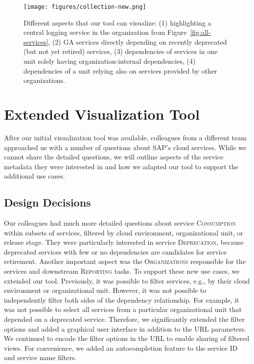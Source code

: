 \documentclass[conference]{IEEEtran}
\begin{document}
\begin{figure}
    \centering
    \texttt{[image: figures/collection-new.png]}
    \caption{Different aspects that our tool can visualize: (1) highlighting a central logging service in the organization from Figure~\ref{fig:all-services}, (2) GA services directly depending on recently deprecated (but not yet retired) services, (3) dependencies of services in one unit solely having organization-internal dependencies, (4) dependencies of a unit relying also on services provided by other organizations.}
    \label{fig:collection}
\end{figure}


\section{Extended Visualization Tool}
\label{sec:visualization-extended}

After our initial visualization tool was available, colleagues from a different team approached us with a number of questions about SAP's cloud services.
While we cannot share the detailed questions, we will outline aspects of the service metadata they were interested in and how we adapted our tool to support the additional use cases.

\subsection{Design Decisions}

Our colleagues had much more detailed questions about service \textsc{Consumption} within subsets of services, filtered by cloud environment, organizational unit, or release stage.
They were particularly interested in service \textsc{Deprecation}, because deprecated services with few or no dependencies are candidates for service retirement.
Another important aspect was the \textsc{Organizations} responsible for the services and downstream \textsc{Reporting} tasks.
To support these new use cases, we extended our tool.
Previously, it was possible to filter services, e.g., by their cloud environment or organizational unit.
However, it was not possible to independently filter both sides of the dependency relationship.
For example, it was not possible to select all services from a particular organizational unit that depended on a deprecated service.
Therefore, we significantly extended the filter options and added a graphical user interface in addition to the URL parameters.
We continued to encode the filter options in the URL to enable sharing of filtered views.
For convenience, we added an autocompletion feature to the service ID and service name filters.
\end{document}
